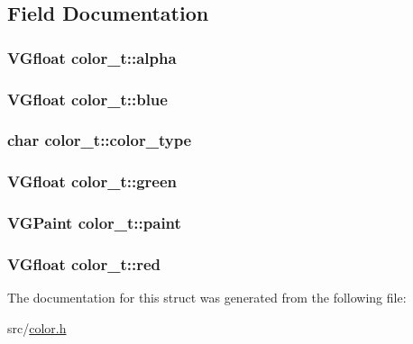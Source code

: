 \subsection{Field Documentation}
\hypertarget{structcolor__t_a6b2539fa5dbd8434813368e7aa915292}{}
\subsubsection[{alpha}]{\setlength{\rightskip}{0pt plus 5cm}V\+Gfloat color\+\_\+t\+::alpha}\label{structcolor__t_a6b2539fa5dbd8434813368e7aa915292}
\hypertarget{structcolor__t_ac8f064542ccd5e271f9c82f41a3a3c31}{}
\subsubsection[{blue}]{\setlength{\rightskip}{0pt plus 5cm}V\+Gfloat color\+\_\+t\+::blue}\label{structcolor__t_ac8f064542ccd5e271f9c82f41a3a3c31}
\hypertarget{structcolor__t_a318a5a811de8979c872107d7a87d2892}{}
\subsubsection[{color\+\_\+type}]{\setlength{\rightskip}{0pt plus 5cm}char color\+\_\+t\+::color\+\_\+type}\label{structcolor__t_a318a5a811de8979c872107d7a87d2892}
\hypertarget{structcolor__t_adf412886d6a8a6a475b7fefcffc57f12}{}
\subsubsection[{green}]{\setlength{\rightskip}{0pt plus 5cm}V\+Gfloat color\+\_\+t\+::green}\label{structcolor__t_adf412886d6a8a6a475b7fefcffc57f12}
\hypertarget{structcolor__t_a17ecc773b13841683517fa109dd87984}{}
\subsubsection[{paint}]{\setlength{\rightskip}{0pt plus 5cm}V\+G\+Paint color\+\_\+t\+::paint}\label{structcolor__t_a17ecc773b13841683517fa109dd87984}
\hypertarget{structcolor__t_a10a626dea6494b5d765719fd8f9d4083}{}
\subsubsection[{red}]{\setlength{\rightskip}{0pt plus 5cm}V\+Gfloat color\+\_\+t\+::red}\label{structcolor__t_a10a626dea6494b5d765719fd8f9d4083}


The documentation for this struct was generated from the following file\+:\begin{DoxyCompactItemize}
\item 
src/\hyperlink{color_8h}{color.\+h}\end{DoxyCompactItemize}
